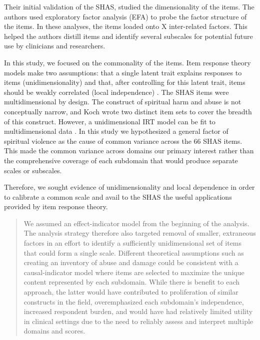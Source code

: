 \documentclass[
]{article}
\begin{document}
Their initial validation of the SHAS, \citet{KochEdstrom2022} studied the dimensionality of the items. The authors used exploratory factor analysis (EFA) to probe the factor structure of the items. In these analyses, the items loaded onto X inter-related factors. This helped the authors distill items and identify several subscales for potential future use by clinicians and researchers.

In this study, we focused on the commonality of the items. Item response theory models make two assumptions: that a single latent trait explains responses to items (unidimensionality) and that, after controlling for this latent trait, items should be weakly correlated (local independence) \citep{EmbretsonReise2000, ReiseWaller2009, ReiseEtAl2013}. The SHAS items were multidimensional by design. The construct of spiritual harm and abuse is not conceptually narrow, and Koch wrote two distinct item sets to cover the breadth of this construct. However, a unidimensional IRT model can be fit to multidimensional data \citep{ReiseEtAl2013}. In this study we hypothesized a general factor of spiritual violence as the cause of common variance across the 66 SHAS items. This made the common variance across domains our primary interest rather than the comprehensive coverage of each subdomain that would produce separate scales or subscales.

Therefore, we sought evidence of unidimensionality and local dependence in order to calibrate a common scale and avail to the SHAS the useful applications provided by item response theory.

\begin{quote}
We assumed an effect-indicator model from the beginning of the analysis. The analysis strategy therefore also targeted removal of smaller, extraneous factors in an effort to identify a sufficiently unidimensional set of items that could form a single scale. Different theoretical assumptions such as creating an inventory of abuse and damage could be consistent with a causal-indicator model where items are selected to maximize the unique content represented by each subdomain. While there is benefit to each approach, the latter would have contributed to proliferation of similar constructs in the field, overemphasized each subdomain's independence, increased respondent burden, and would have had relatively limited utility in clinical settings due to the need to reliably assess and interpret multiple domains and scores.
\end{quote}
\end{document}
